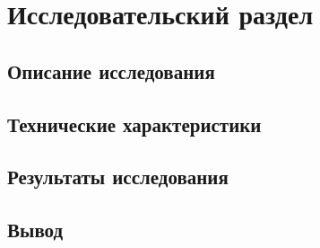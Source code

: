 \section{Исследовательский раздел}



\subsection{Описание исследования}


\subsection*{Технические характеристики}

\subsection{Результаты исследования}

\subsection*{Вывод}

